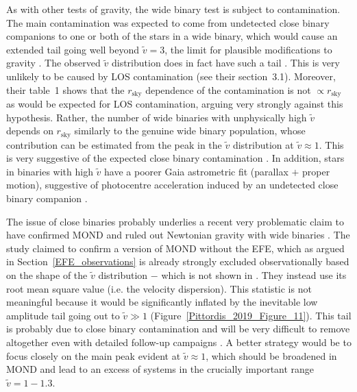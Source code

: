 \documentclass[fleqn,usenatbib,useAMS]{mnras} %
\begin{document}
As with other tests of gravity, the wide binary test is subject to contamination. The main contamination was expected to come from undetected close binary companions to one or both of the stars in a wide binary, which would cause an extended tail going well beyond $\widetilde{v} = 3$, the limit for plausible modifications to gravity \citep{Banik_2018_Centauri}. The observed $\widetilde{v}$ distribution does in fact have such a tail \citep{Pittordis_2019}. This is very unlikely to be caused by LOS contamination (see their section~3.1). Moreover, their table~1 shows that the $r_{\text{sky}}$ dependence of the contamination is not $\propto r_{\text{sky}}$ as would be expected for LOS contamination, arguing very strongly against this hypothesis. Rather, the number of wide binaries with unphysically high $\widetilde{v}$ depends on $r_{\text{sky}}$ similarly to the genuine wide binary population, whose contribution can be estimated from the peak in the $\widetilde{v}$ distribution at $\widetilde{v} \approx 1$. This is very suggestive of the expected close binary contamination \citep{Clarke_2020}. In addition, stars in binaries with high $\widetilde{v}$ have a poorer Gaia astrometric fit (parallax $+$ proper motion), suggestive of photocentre acceleration induced by an undetected close binary companion \citep{Belokurov_2020}.

The issue of close binaries probably underlies a recent very problematic claim to have confirmed MOND and ruled out Newtonian gravity with wide binaries \citep*{Hernandez_2022}. The study claimed to confirm a version of MOND without the EFE, which as argued in Section~\ref{EFE_observations} is already strongly excluded observationally \citep{Pittordis_2019} based on the shape of the $\widetilde{v}$ distribution $-$ which is not shown in \citet{Hernandez_2022}. They instead use its root mean square value (i.e. the velocity dispersion). This statistic is not meaningful because it would be significantly inflated by the inevitable low amplitude tail going out to $\widetilde{v} \gg 1$ (Figure~\ref{Pittordis_2019_Figure_11}). This tail is probably due to close binary contamination and will be very difficult to remove altogether even with detailed follow-up campaigns \citep[see section~8.2 of][]{Banik_2018_Centauri}. A better strategy would be to focus closely on the main peak evident at $\widetilde{v} \approx 1$, which should be broadened in MOND and lead to an excess of systems in the crucially important range $\widetilde{v} = 1-1.3$.
\end{document}
